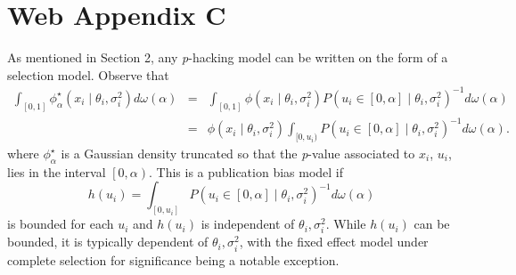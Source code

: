 \section*{Web Appendix C}

As mentioned in Section 2, any \textit{p}-hacking model can be written on the form of a selection model. Observe that
\begin{eqnarray*}
\int_{[0,1]}\phi_\alpha^{\star}(x_{i}\mid\theta_{i},\sigma_{i}^2)d\omega(\alpha) & = & \int_{[0,1]}\phi(x_{i}\mid\theta_{i}, \sigma_i^2)P(u_i\in\left[0,\alpha\right]\mid\theta_{i},\sigma^2_{i})^{-1}d\omega(\alpha)\\
 & = & \phi(x_{i}\mid\theta_{i}, \sigma^2_i)\int_{[0,u_i)}P(u_i\in\left[0,\alpha\right]\mid\theta_{i},\sigma_{i}^2)^{-1}d\omega(\alpha).
\end{eqnarray*}
where $\phi_\alpha^{\star}$ is a Gaussian density truncated so that the \textit{p}-value associated to $x_i$, $u_i$, lies in the interval $\left[0,\alpha\right)$. This is a publication bias model if $$h(u_i)=\int_{[0,u_i]}P(u_i\in\left[0,\alpha\right]\mid\theta_{i},\sigma^2_{i})^{-1}d\omega(\alpha)$$ is bounded for each $u_i$ and $h(u_i)$ is independent of $\theta_{i},\sigma^2_{i}$. While $h(u_i)$ can be bounded, it is typically dependent of $\theta_{i},\sigma^2_{i}$, with the fixed effect model under complete selection for significance being a notable exception.

